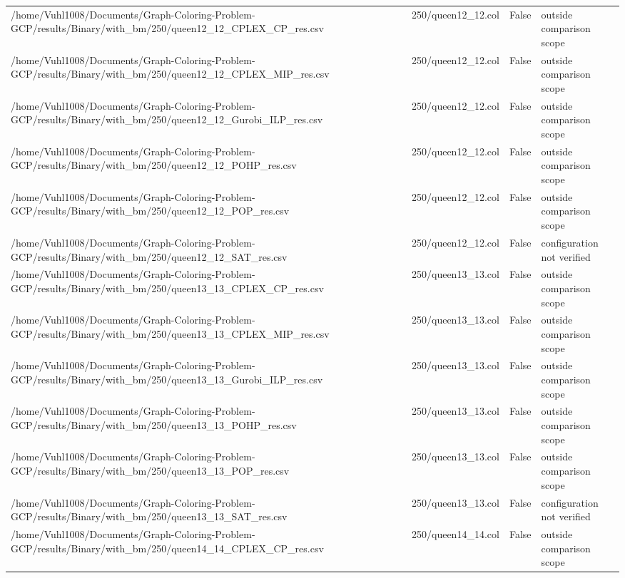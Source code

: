 \begin{table}[htbp]
\begin{tabular}{llll}
/home/Vuhl1008/Documents/Graph-Coloring-Problem-GCP/results/Binary/with\_bm/250/queen12\_12\_CPLEX\_CP\_res.csv & 250/queen12\_12.col & False & outside comparison scope \\
/home/Vuhl1008/Documents/Graph-Coloring-Problem-GCP/results/Binary/with\_bm/250/queen12\_12\_CPLEX\_MIP\_res.csv & 250/queen12\_12.col & False & outside comparison scope \\
/home/Vuhl1008/Documents/Graph-Coloring-Problem-GCP/results/Binary/with\_bm/250/queen12\_12\_Gurobi\_ILP\_res.csv & 250/queen12\_12.col & False & outside comparison scope \\
/home/Vuhl1008/Documents/Graph-Coloring-Problem-GCP/results/Binary/with\_bm/250/queen12\_12\_POHP\_res.csv & 250/queen12\_12.col & False & outside comparison scope \\
/home/Vuhl1008/Documents/Graph-Coloring-Problem-GCP/results/Binary/with\_bm/250/queen12\_12\_POP\_res.csv & 250/queen12\_12.col & False & outside comparison scope \\
/home/Vuhl1008/Documents/Graph-Coloring-Problem-GCP/results/Binary/with\_bm/250/queen12\_12\_SAT\_res.csv & 250/queen12\_12.col & False & configuration not verified \\
/home/Vuhl1008/Documents/Graph-Coloring-Problem-GCP/results/Binary/with\_bm/250/queen13\_13\_CPLEX\_CP\_res.csv & 250/queen13\_13.col & False & outside comparison scope \\
/home/Vuhl1008/Documents/Graph-Coloring-Problem-GCP/results/Binary/with\_bm/250/queen13\_13\_CPLEX\_MIP\_res.csv & 250/queen13\_13.col & False & outside comparison scope \\
/home/Vuhl1008/Documents/Graph-Coloring-Problem-GCP/results/Binary/with\_bm/250/queen13\_13\_Gurobi\_ILP\_res.csv & 250/queen13\_13.col & False & outside comparison scope \\
/home/Vuhl1008/Documents/Graph-Coloring-Problem-GCP/results/Binary/with\_bm/250/queen13\_13\_POHP\_res.csv & 250/queen13\_13.col & False & outside comparison scope \\
/home/Vuhl1008/Documents/Graph-Coloring-Problem-GCP/results/Binary/with\_bm/250/queen13\_13\_POP\_res.csv & 250/queen13\_13.col & False & outside comparison scope \\
/home/Vuhl1008/Documents/Graph-Coloring-Problem-GCP/results/Binary/with\_bm/250/queen13\_13\_SAT\_res.csv & 250/queen13\_13.col & False & configuration not verified \\
/home/Vuhl1008/Documents/Graph-Coloring-Problem-GCP/results/Binary/with\_bm/250/queen14\_14\_CPLEX\_CP\_res.csv & 250/queen14\_14.col & False & outside comparison scope \\

\end{tabular}
\end{table}
